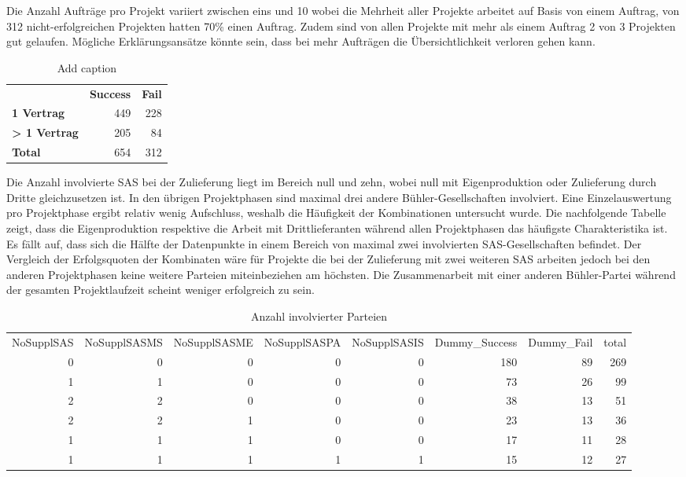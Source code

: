 \newline Die Anzahl Aufträge pro Projekt variiert zwischen eins und 10 wobei die Mehrheit aller Projekte arbeitet auf Basis von einem Auftrag, von 312 nicht-erfolgreichen Projekten hatten 70\% einen Auftrag. Zudem sind von allen Projekte mit mehr als einem Auftrag 2 von 3 Projekten gut gelaufen. Mögliche Erklärungsansätze könnte sein, dass bei mehr Aufträgen die Übersichtlichkeit verloren gehen kann.
\begin{table}[htbp]
	\centering
	\caption{Add caption}
	\begin{tabular}{lrr}
		& \multicolumn{1}{l}{\textbf{Success}} & \multicolumn{1}{l}{\textbf{Fail}} \\
		\textbf{1 Vertrag} & 449   & 228 \\
		\textbf{> 1 Vertrag} & 205   & 84 \\
		\textbf{Total} & 654   & 312 \\
	\end{tabular}%
	\label{tab:addlabel}%
\end{table}%
Die Anzahl involvierte SAS bei der Zulieferung liegt im Bereich null und zehn, wobei null mit Eigenproduktion oder Zulieferung durch Dritte gleichzusetzen ist. In den übrigen Projektphasen sind maximal drei andere Bühler-Gesellschaften involviert. Eine Einzelauswertung pro Projektphase ergibt relativ wenig Aufschluss, weshalb die Häufigkeit der Kombinationen untersucht wurde. Die nachfolgende Tabelle zeigt, dass die Eigenproduktion respektive die Arbeit mit Drittlieferanten während allen Projektphasen das häufigste Charakteristika ist. Es fällt auf, dass sich die Hälfte der Datenpunkte in einem Bereich von maximal zwei involvierten SAS-Gesellschaften befindet. Der Vergleich der Erfolgsquoten der Kombinaten wäre für Projekte die bei der Zulieferung mit zwei weiteren SAS arbeiten jedoch bei den anderen Projektphasen keine weitere Parteien miteinbeziehen am höchsten. Die Zusammenarbeit mit einer anderen Bühler-Partei während der gesamten Projektlaufzeit scheint weniger erfolgreich zu sein.
\begin{table}[htbp]
	\centering
	\caption{Anzahl involvierter Parteien}
	\begin{tabular}{rrrrrrrr}
		\multicolumn{1}{l}{NoSupplSAS} & \multicolumn{1}{l}{NoSupplSASMS} & \multicolumn{1}{l}{NoSupplSASME} & \multicolumn{1}{l}{NoSupplSASPA} & \multicolumn{1}{l}{NoSupplSASIS} & \multicolumn{1}{l}{Dummy\_Success} & \multicolumn{1}{l}{Dummy\_Fail} & \multicolumn{1}{l}{total} \\
		0     & 0     & 0     & 0     & 0     & 180   & 89    & 269 \\
		1     & 1     & 0     & 0     & 0     & 73    & 26    & 99 \\
		2     & 2     & 0     & 0     & 0     & 38    & 13    & 51 \\
		2     & 2     & 1     & 0     & 0     & 23    & 13    & 36 \\
		1     & 1     & 1     & 0     & 0     & 17    & 11    & 28 \\
		1     & 1     & 1     & 1     & 1     & 15    & 12    & 27 \\
	\end{tabular}%
	\label{tab:addlabel}%
\end{table}%
